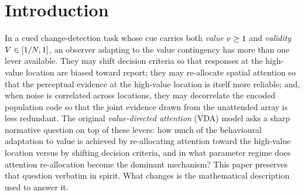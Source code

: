 %
%

\section{Introduction}
\label{sec:intro}

In a cued change-detection task whose cue carries both \emph{value}
$v \ge 1$ and \emph{validity} $V \in [1/N, 1]$, an
observer adapting to the value contingency has more than one lever
available.  They may shift decision criteria so that responses at the
high-value location are biased toward report; they may re-allocate
spatial attention so that the perceptual evidence at the high-value
location is itself more reliable; and, when noise is correlated
across locations, they may decorrelate the encoded population code so
that the joint evidence drawn from the unattended array is less
redundant.  The original \emph{value-directed attention} (VDA) model
asks a sharp normative question on top of these levers: how much of
the behavioural adaptation to value is achieved by re-allocating
attention toward the high-value location versus by shifting decision
criteria, and in what parameter regime does attention re-allocation
become the dominant mechanism?  This paper preserves that question
verbatim in spirit.  What changes is the mathematical description used
to answer it.

